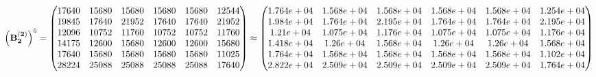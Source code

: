 \documentclass[10pt,a4paper]{article}
\begin{document}
	\[
		\left(\bold{B_2^{(2)}}\right)^{5} = 
		\begin{pmatrix}
			{{17640}}{} & {{15680}}{} & {{15680}}{} & {{15680}}{} & {{15680}}{} & {{12544}}{} \\
			{{19845}}{} & {{17640}}{} & {{21952}}{} & {{17640}}{} & {{17640}}{} & {{21952}}{} \\
			{{12096}}{} & {{10752}}{} & {{11760}}{} & {{10752}}{} & {{10752}}{} & {{11760}}{} \\
			{{14175}}{} & {{12600}}{} & {{15680}}{} & {{12600}}{} & {{12600}}{} & {{15680}}{} \\
			{{17640}}{} & {{15680}}{} & {{15680}}{} & {{15680}}{} & {{15680}}{} & {{11025}}{} \\
			{{28224}}{} & {{25088}}{} & {{25088}}{} & {{25088}}{} & {{25088}}{} & {{17640}}{} \\
		\end{pmatrix}
		\approx
		\begin{pmatrix}
			1.764e+04 & 1.568e+04 & 1.568e+04 & 1.568e+04 & 1.568e+04 & 1.254e+04 \\
			1.984e+04 & 1.764e+04 & 2.195e+04 & 1.764e+04 & 1.764e+04 & 2.195e+04 \\
			1.21e+04 & 1.075e+04 & 1.176e+04 & 1.075e+04 & 1.075e+04 & 1.176e+04 \\
			1.418e+04 & 1.26e+04 & 1.568e+04 & 1.26e+04 & 1.26e+04 & 1.568e+04 \\
			1.764e+04 & 1.568e+04 & 1.568e+04 & 1.568e+04 & 1.568e+04 & 1.102e+04 \\
			2.822e+04 & 2.509e+04 & 2.509e+04 & 2.509e+04 & 2.509e+04 & 1.764e+04 \\
		\end{pmatrix}
	\]
\end{document}
